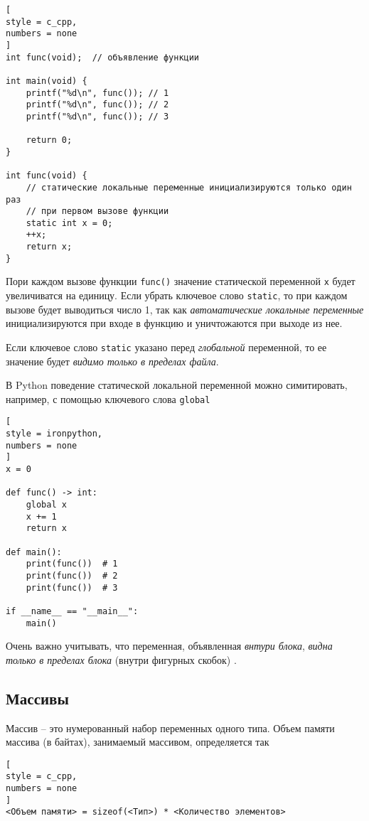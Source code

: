 \documentclass[%
	11pt,
	a4paper,
	utf8,
		]{article}
\begin{document}
\begin{itemize}
\begin{lstlisting}[
style = c_cpp,
numbers = none
]
int func(void);  // объявление функции

int main(void) {
    printf("%d\n", func()); // 1
    printf("%d\n", func()); // 2
    printf("%d\n", func()); // 3
    
    return 0;
}

int func(void) {
	// статические локальные переменные инициализируются только один раз
	// при первом вызове функции
    static int x = 0;  
    ++x;
    return x;
}
\end{lstlisting}

Пори каждом вызове функции \verb*|func()| значение статической переменной \verb|x| будет увеличиватся на единицу. Если убрать ключевое слово \verb*|static|, то при каждом вызове будет выводиться число 1, так как \emph{автоматические локальные переменные} инициализируются при входе в функцию и уничтожаются при выходе из нее.

Если ключевое слово \verb|static| указано перед \emph{глобальной} переменной, то ее значение будет \emph{видимо только в пределах файла}.
\end{itemize}

В Python поведение статической локальной переменной можно симитировать, например, с помощью ключевого слова \verb*|global|
\begin{lstlisting}[
style = ironpython,
numbers = none
]
x = 0

def func() -> int:
    global x
    x += 1
    return x

def main():
	print(func())  # 1
	print(func())  # 2
	print(func())  # 3
	
if __name__ == "__main__":
    main()
\end{lstlisting}

Очень важно учитывать, что переменная, объявленная \emph{внтури блока}, \emph{видна} \emph{только в пределах блока} (внутри фигурных скобок) \cite[]{prokhorenok-prog-c:2020}.

\subsection{Массивы}

Массив -- это нумерованный набор переменных одного типа. Объем памяти массива (в байтах), занимаемый массивом, определяется так
\begin{lstlisting}[
style = c_cpp,
numbers = none
]
<Объем памяти> = sizeof(<Тип>) * <Количество элементов>
\end{lstlisting}
\end{document}
